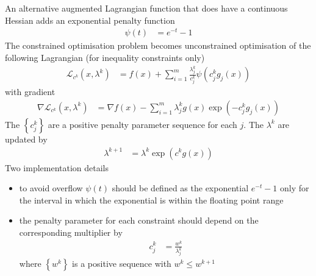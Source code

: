 \documentclass[a4paper,twoside,10pt,english]{report}
\begin{document}
An alternative augmented Lagrangian function that does have a continuous
Hessian adds an exponential penalty function
\begin{align*}
\psi\left(t\right) &= e^{-t}-1
\end{align*}
The constrained optimisation problem becomes unconstrained optimisation
of the following Lagrangian (for inequality constraints only) 
\begin{align*}
\mathcal{L}_{c^{k}}\left(x,\lambda^{k}\right) &= f\left(x\right)+
\sum_{i=1}^{m}\frac{\lambda_{j}^{k}}{c_{j}^{k}}
\psi\left(c_{j}^{k}g_{j}\left(x\right)\right)
\end{align*}
with gradient
\begin{align*}
\nabla \mathcal{L}_{c^{k}}\left(x,\lambda^{k}\right) &= \nabla f\left(x\right)-\sum_{i=1}^{m}\lambda_{j}^{k}g\left(x\right)\exp\left(-c_{j}^{k}g_{j}\left(x\right)\right)
\end{align*}
The $\left\{ c_{j}^{k}\right\} $ are a positive penalty parameter
sequence for each $j$. The $\lambda^{k}$ are updated by
\begin{align*}
\lambda^{k+1} &= \lambda^{k}\exp\left(c^{k}g\left(x\right)\right)
\end{align*}
Two implementation details
\begin{itemize}
\item to avoid overflow $\psi\left(t\right)$ should be defined as the exponential
$e^{-t}-1$ only for the interval in which the exponential is within
the floating point range
\item the penalty parameter for each constraint should depend on the corresponding
multiplier by
\begin{align*}
c_{j}^{k} &= \frac{w^{k}}{\lambda_{j}^{k}}
\end{align*}
where $\left\{ w^{k}\right\} $ is a positive sequence with $w^{k}\le w^{k+1}$
\end{itemize}
\end{document}
